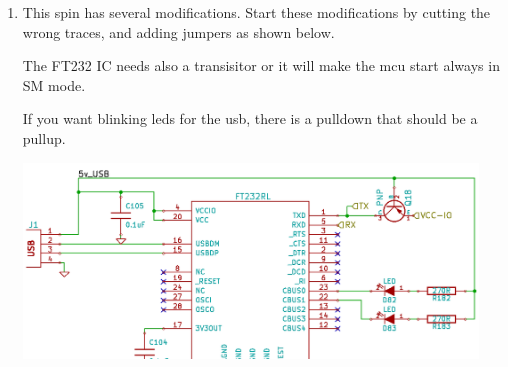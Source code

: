 \documentclass[12pt,a4paper,titlepage]{article}
\begin{document}
\begin{enumerate}
\item This spin has several modifications. Start these modifications by cutting the wrong traces, and adding jumpers as shown below.

The FT232 IC needs also a transisitor or it will make the mcu start always in SM mode.

If you want blinking leds for the usb, there is a pulldown that should be a pullup.

\includegraphics[width=0.95\textwidth]{images/FT232_sch.png}


\end{enumerate}
\end{document}
